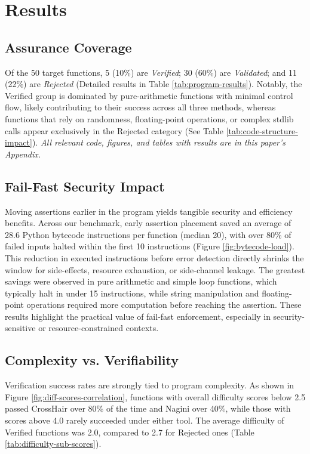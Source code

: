\documentclass[8pt]{extarticle}
\begin{document}
\section{Results}

\subsection{Assurance Coverage}

Of the 50 target functions, 5 (10\%) are \emph{Verified}; 30 (60\%) are \emph{Validated}; and 11 (22\%) are \emph{Rejected} (Detailed results in Table \ref{tab:program-results}). Notably, the Verified group is dominated by pure-arithmetic functions with minimal control flow, likely contributing to their success across all three methods, whereas functions that rely on randomness, floating-point operations, or complex stdlib calls appear exclusively in the Rejected category (See Table \ref{tab:code-structure-impact}). \textit{All relevant code, figures, and tables with results are in this paper's Appendix.}

\subsection{Fail-Fast Security Impact}

Moving assertions earlier in the program yields tangible security and efficiency benefits. Across our benchmark, early assertion placement saved an average of 28.6 Python bytecode instructions per function (median 20), with over 80\% of failed inputs halted within the first 10 instructions (Figure \ref{fig:bytecode-load}). This reduction in executed instructions before error detection directly shrinks the window for side-effects, resource exhaustion, or side-channel leakage. The greatest savings were observed in pure arithmetic and simple loop functions, which typically halt in under 15 instructions, while string manipulation and floating-point operations required more computation before reaching the assertion. These results highlight the practical value of fail-fast enforcement, especially in security-sensitive or resource-constrained contexts.

\subsection{Complexity vs. Verifiability}

Verification success rates are strongly tied to program complexity. As shown in Figure \ref{fig:diff-scores-correlation}, functions with overall difficulty scores below 2.5 passed CrossHair over 80\% of the time and Nagini over 40\%, while those with scores above 4.0 rarely succeeded under either tool. The average difficulty of Verified functions was 2.0, compared to 2.7 for Rejected ones (Table \ref{tab:difficulty-sub-scores}).
\end{document}
